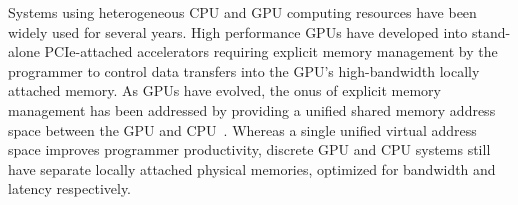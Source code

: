 %
Systems using heterogeneous CPU and GPU computing resources have been widely
used for several years.
High performance GPUs have developed into stand-alone PCIe-attached
accelerators requiring explicit memory management by the programmer to control
data transfers into the GPU's high-bandwidth locally attached memory. As GPUs
have evolved, the onus of explicit memory management has been addressed by
providing a unified shared memory address space between the GPU and
CPU~\cite{UVM,HSA}.  Whereas a single unified virtual address space improves
programmer productivity, discrete GPU and CPU systems still have separate
locally attached physical memories, optimized for bandwidth and latency
respectively. 


